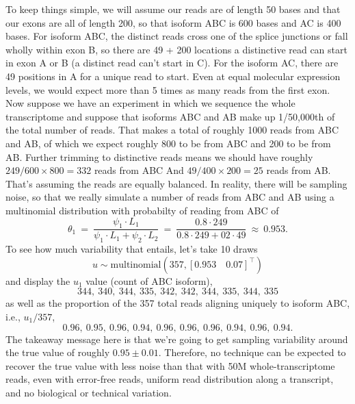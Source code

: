 \documentclass[11pt]{report}
\newcommand{\vect}[1]{[#1]^{\top}}
\newcommand{\rdistro}[2]{\textrm{#1}\!\left( #2 \right)}
\begin{document}
To keep things simple, we will assume our reads are of length 50 bases
and that our exons are all of length 200, so that isoform ABC is 600
bases and AC is 400 bases.  For isoform ABC, the distinct reads cross
one of the splice junctions or fall wholly within exon B, so there are
49 + 200 locations a distinctive read can start in exon A or B (a
distinct read can't start in C). For the isoform AC, there are 49
positions in A for a unique read to start.  Even at equal molecular
expression levels, we would expect more than 5 times as many reads
from the first exon.  Now suppose we have an experiment in which we
sequence the whole transcriptome and suppose that isoforms ABC and AB
make up 1/50,000th of the total number of reads.  That makes a total
of roughly 1000 reads from ABC and AB, of which we expect roughly 800
to be from ABC and 200 to be from AB.  Further trimming to distinctive
reads means we should have roughly $249/600 \times 800 = 332$ reads
from ABC And $49/400 \times 200 = 25$ reads from AB.  That's assuming
the reads are equally balanced.  In reality, there will be sampling
noise, so that we really simulate a number of reads from ABC and AB
using a multinomial distribution with probabilty of reading from ABC
of 
\[
  \theta_1
  \ = \ \frac{\psi_1 \cdot L_1}{\psi_1 \cdot L_1 + \psi_2 \cdot L_2}
  \ = \ \frac{0.8 \cdot 249}{0.8 \cdot 249 + 02 \cdot 49}
  \ \approx \ 0.953.
\]
To see how much variability that entails, let's take 10 draws
\[
  u \sim \rdistro{multinomial}{357, \vect{0.953 \quad 0.07}}
\]
and display the $u_1$ value (count of ABC isoform),
\[
344, \ 340, \ 344, \ 335, \ 342, \ 342, \ 344, \ 335, \ 344, \ 335
\]
as well as the proportion of the 357 total reads aligning uniquely to
isoform ABC, i.e., $u_1 / 357$,
\[
0.96, \ 0.95, \ 0.96, \ 0.94, \ 0.96, \ 0.96, \ 0.96, \ 0.94, \ 0.96, \ 0.94. 
\]
The takeaway message here is that we're going to get sampling
variability around the true value of roughly $0.95 \pm 0.01$.
Therefore, no technique can be expected to recover the true value with
less noise than that with 50M whole-transcriptome reads, even with
error-free reads, uniform read distribution along a transcript, and no
biological or technical variation.
\end{document}
